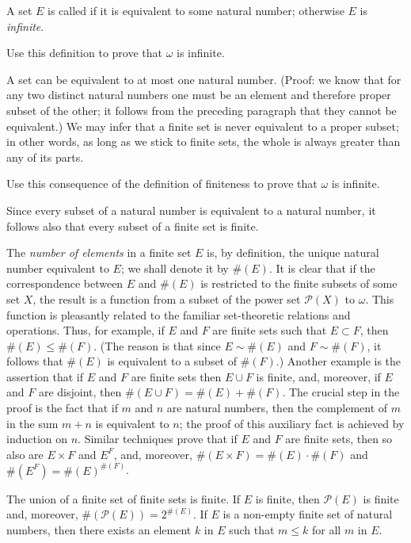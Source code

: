 A set $E$ is called  if it is equivalent to some natural number; otherwise $E$ is \textit{infinite}.
 
\begin{exercise} Use this definition to prove that $\omega$ is infinite.
\end{exercise}

A set can be equivalent to at most one natural number. (Proof: we know that for any two distinct natural numbers one must be an element and therefore proper subset of the other; it follows from the preceding paragraph that they cannot be equivalent.) We may infer that a finite set is never equivalent to a proper subset; in other words, as long as we stick to finite sets, the whole is always greater than any of its parts. 

\begin{exercise}  Use this consequence of the definition of finiteness to prove that $\omega$ is infinite. 
\end{exercise}

Since every subset of a natural number is equivalent to a natural number, it follows also that every subset of a finite set is finite. 

The \textit{number of elements} in a finite set $E$ is, by definition, the unique natural number equivalent to $E$; we shall denote it by $\# (E)$. It is clear that if the correspondence between $E$ and $\# (E)$ is restricted to the finite subsets of some set $X$, the result is a function from a subset of the power set $\mathcal{P}(X)$ to $\omega$. This function is pleasantly related to the familiar set-theoretic relations and operations. Thus, for example, if $E$ and $F$ are finite sets such that $E \subset F$, then $\# (E) \le \# (F)$. (The reason is that since $E \sim \# (E)$ and $F \sim \# (F)$, it follows that $\# (E)$ is equivalent to a subset of $\# (F)$.) Another example is the assertion that if $E$ and $F$ are finite sets then $E \cup F$ is finite, and, moreover, if $E$ and $F$ are disjoint, then $\# (E \cup F) = \# (E) + \# (F)$. The crucial step in the proof is the fact that if $m$ and $n$ are natural numbers, then the complement of $m$ in the sum $m + n$ is equivalent to $n$; the proof of this auxiliary fact is achieved by induction on $n$. Similar techniques prove that if $E$ and $F$ are finite sets, then so also are $E \times F$ and $E^{F}$, and, moreover, $\# (E \times F) = \# (E) \cdot \# (F)$ and  $\# (E^{F}) = \# (E)^{\# (F)}$. 

\begin{exercise} The union of a finite set of finite sets is finite. If $E$ is finite, then $\mathcal{P}(E)$ is finite and, moreover, $\# (\mathcal{P}(E)) = 2^{\# (E)}$. If $E$ is a non-empty finite set of natural numbers, then there exists an element $k$ in $E$ such that $m \le k$ for all $m$ in $E$. 
\end{exercise}
